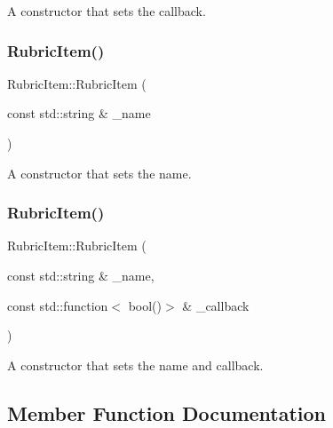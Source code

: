 A constructor that sets the callback. \hypertarget{class_rubric_item_a983d89dd363b56df35c0685c083e7172}{}\label{class_rubric_item_a983d89dd363b56df35c0685c083e7172} 
\subsubsection{\texorpdfstring{Rubric\+Item()}{RubricItem()}\hspace{0.1cm}{\footnotesize\ttfamily [3/4]}}
{\footnotesize\ttfamily Rubric\+Item\+::\+Rubric\+Item (\begin{DoxyParamCaption}\item[{const std\+::string \&}]{\+\_\+name }\end{DoxyParamCaption})\hspace{0.3cm}{\ttfamily [inline]}}

A constructor that sets the name. \hypertarget{class_rubric_item_ae2ff2692b1eb2250e76d3da3fe6fbe79}{}\label{class_rubric_item_ae2ff2692b1eb2250e76d3da3fe6fbe79} 
\subsubsection{\texorpdfstring{Rubric\+Item()}{RubricItem()}\hspace{0.1cm}{\footnotesize\ttfamily [4/4]}}
{\footnotesize\ttfamily Rubric\+Item\+::\+Rubric\+Item (\begin{DoxyParamCaption}\item[{const std\+::string \&}]{\+\_\+name,  }\item[{const std\+::function$<$ bool()$>$ \&}]{\+\_\+callback }\end{DoxyParamCaption})\hspace{0.3cm}{\ttfamily [inline]}}

A constructor that sets the name and callback. 

\subsection{Member Function Documentation}
\hypertarget{class_rubric_item_a83b1d15314c14b6e67207f086d7fa6a5}{}\label{class_rubric_item_a83b1d15314c14b6e67207f086d7fa6a5} 
